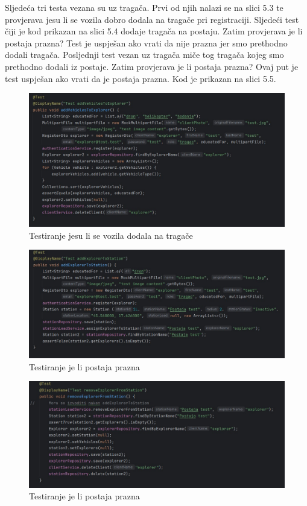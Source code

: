 			Sljedeća tri testa vezana su uz tragača. Prvi od njih nalazi se na slici 5.3 te provjerava jesu li se vozila dobro dodala na tragače pri registraciji. Sljedeći test čiji je kod prikazan na slici 5.4 dodaje tragača na postaju. Zatim provjerava je li postaja prazna? Test je uspješan ako vrati da nije prazna jer smo prethodno dodali tragača. Posljednji test vezan uz tragača miče tog tragača kojeg smo prethodno dodali iz postaje. Zatim provjerava je li postaja prazna? Ovaj put je test uspješan ako vrati da je postaja prazna. Kod je prikazan na slici 5.5. 
			
			\begin{figure}[H]
				\centering
				\includegraphics[width=\textwidth]{slike/tragac1.JPEG}
				\caption{Testiranje jesu li se vozila dodala na tragače}
				\label{fig:dijagram_baze}
			\end{figure}
			
			\begin{figure}[H]
				\centering
				\includegraphics[width=\textwidth]{slike/tragac2.JPEG}
				\caption{Testiranje je li postaja prazna }
				\label{fig:dijagram_baze}
			\end{figure}
			
			\begin{figure}[H]
				\centering
				\includegraphics[width=\textwidth]{slike/tragac3.JPEG}
				\caption{Testiranje je li postaja prazna }
				\label{fig:dijagram_baze}
			\end{figure}
			
